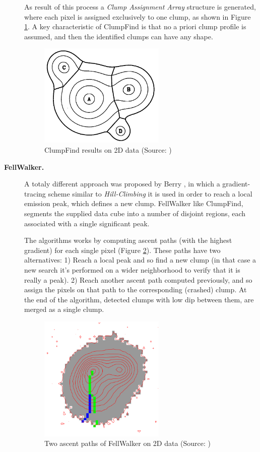 \documentclass[letter, 11pt]{article}
\begin{document}
\begin{description}
    As result of this process a \textit{Clump Assignment Array} structure is generated, where each pixel is assigned exclusively to one clump, as shown in Figure \ref{fig:cf}. A key characteristic of ClumpFind is that no a priori clump profile is assumed, and then the identified clumps can have any shape.
    \begin{figure}[htpb!]
    \centering
    \includegraphics[width=6cm]{cf}
    \caption{ClumpFind results on 2D data (Source: \cite{Williams})}
    \label{fig:cf}
    \end{figure}

    \item[\textbf{FellWalker.}] A totaly different approach was proposed by Berry \cite{Berry}, in which a gradient-tracing scheme similar to \textit{Hill-Climbing} it is used in order to reach a local emission peak, which defines a new clump. FellWalker like ClumpFind, segments the supplied data cube into a number of disjoint regions, each associated with a single significant peak.

    The algorithms works by computing ascent paths (with the highest gradient) for each single pixel (Figure \ref{fig:fw}). These paths have two alternatives: 1) Reach a local peak and so find a new clump (in that case a new search it's performed on a wider neighborhood to verify that it is really a peak). 2) Reach another ascent path computed previously, and so assign the pixels on that path to the corresponding (crashed) clump. At the end of the algorithm, detected clumps with low dip between them, are merged as a single clump.
    \begin{figure}[htpb!]
    \centering
    \includegraphics[width=6cm]{fw}
    \caption{Two ascent paths of FellWalker on 2D data (Source: \cite{Berry})}
    \label{fig:fw}
    \end{figure}

\end{description}
\end{document}
